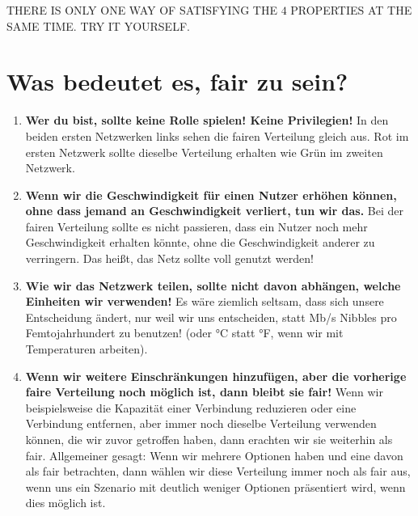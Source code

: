 \documentclass[pageborders]{zibposter}
\newcommand{\en}[1]{{\color{gray}#1}}
\begin{document}
{\begin{minipage}[c]{0.45\linewidth}
\begin{minipage}[c]{0.8\linewidth}
\begin{center}
          \vspace*{0.5cm}
          \en{ \LARGE THERE IS ONLY ONE WAY OF SATISFYING THE $4$ PROPERTIES AT THE SAME TIME. TRY IT YOURSELF.}
      \end{center}
      \end{minipage}

      \end{minipage}%
      \begin{minipage}[c]{0.5\linewidth}
          \vspace*{0.8cm}
          \section*{Was bedeutet es, fair zu sein?}
          \begin{enumerate}
              \item[\circled{$1$}] \textbf{Wer du bist, sollte keine Rolle spielen! Keine Privilegien!} In den beiden ersten Netzwerken links sehen die fairen Verteilung gleich aus. Rot im ersten Netzwerk sollte dieselbe Verteilung erhalten wie Grün im zweiten Netzwerk.
            \item[\circled{$2$}] \textbf{Wenn wir die Geschwindigkeit für einen Nutzer erhöhen können, ohne dass jemand an Geschwindigkeit verliert, tun wir das.}
                  Bei der fairen Verteilung sollte es nicht passieren, dass ein Nutzer noch mehr Geschwindigkeit erhalten könnte, ohne die Geschwindigkeit anderer zu verringern. Das heißt, das Netz sollte voll genutzt werden!
              \item[\circled{$3$}] \textbf{Wie wir das Netzwerk teilen, sollte nicht davon abhängen, welche Einheiten wir verwenden!} Es wäre ziemlich seltsam, dass sich unsere Entscheidung ändert, nur weil wir uns entscheiden, statt Mb/s Nibbles pro Femtojahrhundert zu benutzen! (oder °C statt °F, wenn wir mit Temperaturen arbeiten).
              \item[\circled{$4$}] \textbf{Wenn wir weitere Einschränkungen hinzufügen, aber die vorherige faire Verteilung noch möglich ist, dann bleibt sie fair!} Wenn wir beispielsweise die Kapazität einer Verbindung reduzieren oder eine Verbindung entfernen, aber immer noch dieselbe Verteilung verwenden können, die wir zuvor getroffen haben, dann erachten wir sie weiterhin als fair. Allgemeiner gesagt: Wenn wir mehrere Optionen haben und eine davon als fair betrachten, dann wählen wir diese Verteilung immer noch als fair aus, wenn uns ein Szenario mit deutlich weniger Optionen präsentiert wird, wenn dies möglich ist.
          \end{enumerate}
          \en{
          \vspace*{-1.7cm}
}
\end{minipage}}
\end{document}
